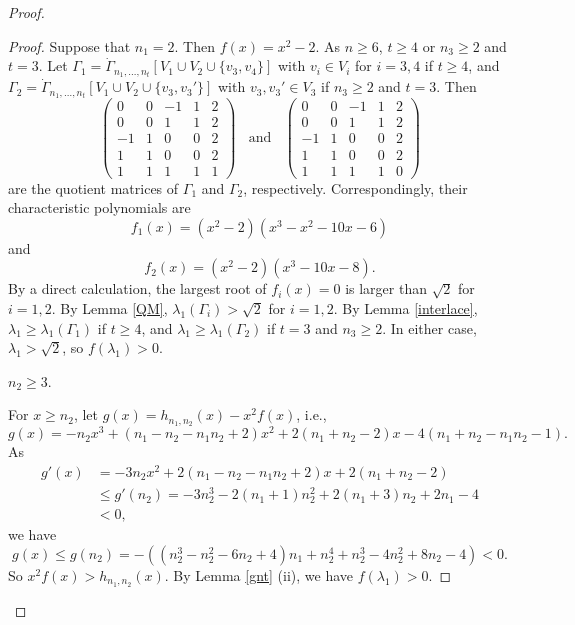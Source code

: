 \documentclass[12pt]{article}
\numberwithin{equation}{section}
\begin{document}
\begin{proof}
\begin{proof}
Suppose that $n_1=2$. Then $f(x)=x^2-2$. As $n\ge 6$, $t\ge 4$ or $n_3\ge 2$ and $t=3$. 
Let $\Gamma_1=\dot\Gamma_{n_1, \dots,  n_t}[V_1\cup V_2\cup \{v_3, v_4\}]$ with $v_i\in V_i$ for $i=3, 4$ if $t\ge 4$, and $\Gamma_2=\dot\Gamma_{n_1, \dots,  n_t}[V_1\cup V_2\cup \{v_3, v_3'\}]$ with $v_3, v_3'\in V_3$ if $n_3\ge 2$ and $t=3$. Then 
\[
\begin{pmatrix}
	0 & 0 & -1 & 1 & 2 \\
	0 & 0 & 1 & 1 & 2 \\
	-1 & 1 & 0 &  0 & 2 \\
	1 & 1 & 0 &  0 & 2 \\
	1 & 1 & 1 & 1 & 1 
\end{pmatrix}\ \ \ \ 
\text{and} \ \ \ \ 
\begin{pmatrix}
	0 & 0 & -1 & 1 & 2 \\
	0 & 0 & 1 & 1 & 2 \\
	-1 & 1 & 0 & 0 & 2 \\
	1 & 1 & 0 & 0 & 2 \\
	1 & 1 & 1 & 1 & 0 
\end{pmatrix}
\]
are the quotient matrices of $\Gamma_1$ and $\Gamma_2$, respectively. Correspondingly, their characteristic polynomials are 
\[
f_1(x)=(x^2-2)(x^3-x^2-10x-6)
\]
and 
\[
f_2(x)=(x^2-2)(x^3-10x-8). 
\]
By a direct calculation, the largest root of $f_i(x)=0$ is larger than $\sqrt{2}$ for $i=1,2$. 
By Lemma \ref{QM}, $\lambda_1(\Gamma_i)>\sqrt{2}$ for $i=1,2$. 
By Lemma \ref{interlace}, $\lambda_1\ge \lambda_1(\Gamma_1)$ if $t\ge 4$, and $\lambda_1\ge \lambda_1(\Gamma_2)$ if $t=3$ and $n_3\ge 2$. 
In either case, $\lambda_1>\sqrt{2}$, so $f(\lambda_1)>0$. 


 $n_2\ge 3$. 

For $x\ge n_2$, let $g(x)=h_{n_1,n_2}(x)-x^2f(x)$, i.e., 
\[
g(x)= -n_2x^3+(n_1-n_2-n_1n_2+2)x^2+2(n_1+n_2-2)x-4(n_1+n_2-n_1n_2-1).
\]
As 
\begin{align*}
g'(x)& =-3n_2x^2+2(n_1-n_2-n_1n_2+2)x+2(n_1+n_2-2)\\
& \le g'(n_2)=-3n_2^3-2(n_1+1)n_2^2+2(n_1+3)n_2+2n_1-4\\
& <0, 
\end{align*}
we have
\[
g(x)\le g(n_2)=-((n_2^3-n_2^2-6n_2+4)n_1+n_2^4+n_2^3-4n_2^2+8n_2-4)<0. 
\]
So $x^2f(x)> h_{n_1, n_2}(x)$. 
By Lemma \ref{gnt} (ii), we have $f(\lambda_1)>0$.
\end{proof}






\end{proof}
\end{document}
